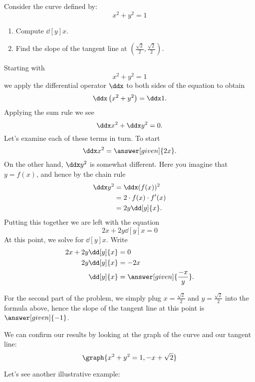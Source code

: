 \documentclass{ximera}
\begin{document}
\begin{example}
Consider the curve defined by:
\[
x^2 + y^2 = 1
\]
\begin{enumerate}
\item Compute $\dd[y]{x}$.
\item Find the slope of the tangent line at $\left(\frac{\sqrt{2}}{2},\frac{\sqrt{2}}{2}\right)$.
\end{enumerate}
\begin{explanation}
  Starting with 
\[
x^2 + y^2 = 1
\]
we apply the differential operator $\ddx$ to both sides of the
equation to obtain
\[
\ddx \left(x^2+y^2\right) = \ddx 1.
\]
Applying the sum rule we see
\[
\ddx x^2+\ddx y^2 = 0.
\]
Let's examine each of these terms in turn. To start
\[
\ddx x^2 = \answer[given]{2x}.
\]
On the other hand, $\ddx y^2$ is somewhat different. Here you imagine that $y = f(x)$, and hence by the chain rule
\begin{align*}
\ddx y^2 &= \ddx (f(x))^2 \\ 
&= 2\cdot f(x) \cdot f'(x) \\
&= 2y\dd[y]{x}.
\end{align*}
Putting this together we are left with the equation
\[
2x + 2y\dd[y]{x} =0
\]
At this point, we solve for $\dd[y]{x}$. Write
\begin{align*}
2x + 2y\dd[y]{x} &= 0\\
2y \dd[y]{x} &= -2x\\
\dd[y]{x} &= \answer[given]{\frac{-x}{y}}.
\end{align*}

For the second part of the problem, we simply plug $x=\frac{\sqrt{2}}{2}$ and $y=\frac{\sqrt{2}}{2}$
into the formula above, hence the slope of the tangent line at this point 
is $\answer[given]{-1}$.
\begin{onlineOnly}
  We can confirm our results by looking at the graph of the curve and
  our tangent line:
  \[
  \graph{x^2+y^2=1,-x+\sqrt{2}}
  \]
\end{onlineOnly}
\end{explanation}
\end{example}

Let's see another illustrative example:
\end{document}
